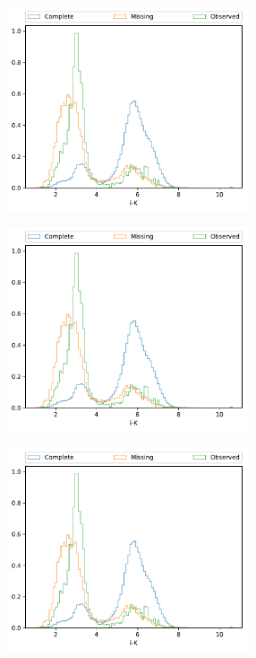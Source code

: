 \begin{figure}[ht!]
    \centering
    \begin{subfigure}[t]{0.45\textwidth}
        \includegraphics[page=2,height=6cm]{background/Figures/Check_distributions.pdf}
    \end{subfigure}
    \begin{subfigure}[t]{0.45\textwidth}
      \includegraphics[page=3,height=6cm]{background/Figures/Check_distributions.pdf}
    \end{subfigure}
     \begin{subfigure}[t]{0.45\textwidth}
      \includegraphics[page=4,height=6cm]{background/Figures/Check_distributions.pdf}
    \end{subfigure}
     \begin{subfigure}[t]{0.45\textwidth}

\end{subfigure}
\end{figure}
